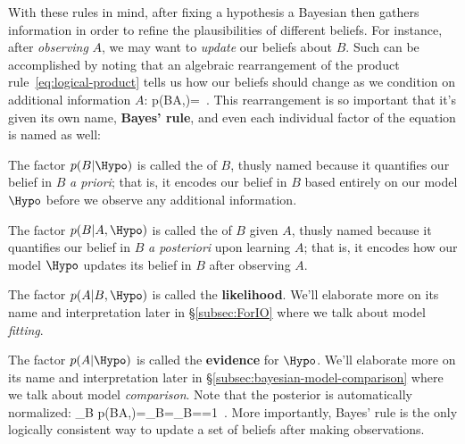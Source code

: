With these rules in mind, after fixing a hypothesis a Bayesian then gathers information in order to refine the plausibilities of different beliefs.
For instance, after \emph{observing} $A$, we may want to \emph{update} our beliefs about $B$.
Such  can be accomplished by noting that an algebraic rearrangement of the product rule~\eqref{eq:logical-product} tells us how our beliefs should change as we condition on additional information $A$:
\be\label{eq:Bayes-rule}
p(B\vert A,\Hypo)=\, . %
\ee
This rearrangement is so important that it's given its own name, \textbf{Bayes' rule}, and even each individual factor of the equation
is named as well:
\bi
\item The factor $p(B\vert\Hypo)$ is called the  of $B$, thusly named because it quantifies our belief in $B$ \emph{a priori}; that is, it encodes our belief in $B$  based entirely on our model $\Hypo$ before we observe any additional information.
\item The factor $p(B\vert A,\Hypo)$ is called the  of $B$ given $A$, thusly named because it quantifies our belief in $B$ \emph{a posteriori} upon learning $A$; that is, it encodes how our model $\Hypo$ updates its belief in $B$ after
 observing $A$.
\item The factor $p(A\vert B,\Hypo)$ is called the \textbf{likelihood}.
We'll elaborate more on its name and interpretation later in \S\ref{subsec:ForIO} where we talk about model \emph{fitting}.
\item The factor $p(A\vert\Hypo)$ is called the \textbf{evidence} for $\Hypo$.
We'll elaborate more on its name and interpretation later in \S\ref{subsec:bayesian-model-comparison} where we talk about model \emph{comparison}.
\ei
Note that the posterior is automatically normalized:
\be\label{eq:Bayes-consistency}
\sum_{B} p(B\vert A,\Hypo)=\sum_{B}=\sum_{B}==1\, .
\ee
More importantly, Bayes' rule %
 is the only logically consistent way to update a set of beliefs after making observations. 








